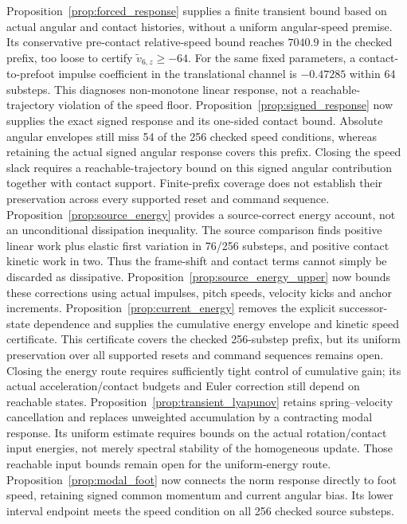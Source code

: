 Proposition~\ref{prop:forced_response} supplies a finite transient bound based on actual angular and contact histories, without a uniform angular-speed premise.
Its conservative pre-contact relative-speed bound reaches $7040.9$ in the checked prefix, too loose to certify $\widetilde v_{6,z}\ge-64$.
For the same fixed parameters, a contact-to-prefoot impulse coefficient in the translational channel is $-0.47285$ within 64 substeps.
This diagnoses non-monotone linear response, not a reachable-trajectory violation of the speed floor.
Proposition~\ref{prop:signed_response} now supplies the exact signed response and its one-sided contact bound.
Absolute angular envelopes still miss 54 of the 256 checked speed conditions, whereas retaining the actual signed angular response covers this prefix.
Closing the speed slack requires a reachable-trajectory bound on this signed angular contribution together with contact support.
Finite-prefix coverage does not establish their preservation across every supported reset and command sequence.
Proposition~\ref{prop:source_energy} provides a source-correct energy account, not an unconditional dissipation inequality.
The source comparison finds positive linear work plus elastic first variation in 76/256 substeps, and positive contact kinetic work in two.
Thus the frame-shift and contact terms cannot simply be discarded as dissipative.
Proposition~\ref{prop:source_energy_upper} now bounds these corrections using actual impulses, pitch speeds, velocity kicks and anchor increments.
Proposition~\ref{prop:current_energy} removes the explicit successor-state dependence and supplies the cumulative energy envelope and kinetic speed certificate.
This certificate covers the checked 256-substep prefix, but its uniform preservation over all supported resets and command sequences remains open.
Closing the energy route requires sufficiently tight control of cumulative gain; its actual acceleration/contact budgets and Euler correction still depend on reachable states.
Proposition~\ref{prop:transient_lyapunov} retains spring--velocity cancellation and replaces unweighted accumulation by a contracting modal response.
Its uniform estimate requires bounds on the actual rotation/contact input energies, not merely spectral stability of the homogeneous update.
Those reachable input bounds remain open for the uniform-energy route.
Proposition~\ref{prop:modal_foot} now connects the norm response directly to foot speed, retaining signed common momentum and current angular bias.
Its lower interval endpoint meets the speed condition on all 256 checked source substeps.
